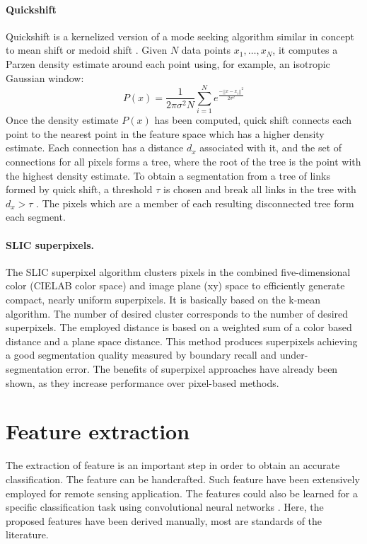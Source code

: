 \paragraph{Quickshift \\}
Quickshift \citep{vedaldi2008quick} is a kernelized version of a mode seeking algorithm similar in concept to mean shift \citep{comaniciu2002mean, fukunaga1975estimation} or medoid shift \citep{sheikh2007mode}. Given $N$ data points $x_{1} , \hdots , x_{N}$, it computes a Parzen density estimate around each point using, for example, an isotropic Gaussian window:
\begin{equation}
P(x)=\frac{1}{2 \pi \sigma^{2} N}\sum_{i=1}^{N}e^{\frac{-||x-x_{i}||^{2}}{2 \sigma^{2}}}
\end{equation}
Once the density estimate $P(x)$ has been computed, quick shift connects each point to the nearest point in the feature space which has a higher density estimate. Each connection has a distance $d_{x}$ associated with it, and the set of connections for all pixels forms a tree, where the root of the tree is the point with the highest density estimate. 
To obtain a segmentation from a tree of links formed by quick shift, a threshold $\tau$ is chosen and break all links in the tree with $d_ {x} > \tau$ . The pixels which are a member of each resulting disconnected tree form each segment.

\paragraph{SLIC superpixels. \\}
The SLIC superpixel algorithm \citep{achanta2012slic} clusters pixels in the combined five-dimensional color (CIELAB color space) and image plane (xy) space to efficiently generate compact, nearly uniform superpixels. It is basically based on the k-mean algorithm. The number of desired cluster corresponds to the number of desired superpixels. The employed distance is based on a weighted sum of a color based distance and a plane space distance. This method produces superpixels achieving a good segmentation quality measured by boundary recall and under-segmentation error. The benefits of superpixel approaches have already been shown, as they increase performance over pixel-based methods.


\section{Feature extraction}
The extraction of feature is an important step in order to obtain an accurate classification. The feature can be handcrafted. Such feature have been extensively employed for remote sensing application. The features could also be learned for a specific classification task using convolutional neural networks \citep{demuth2014neural}. Here, the proposed features have been derived manually, most are standards of the literature.
